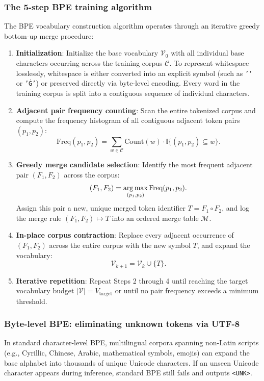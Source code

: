 \documentclass[../../../main.tex]{subfiles}
\begin{document}
\subsubsection{The 5-step BPE training algorithm}
The BPE vocabulary construction algorithm operates through an iterative greedy bottom-up merge procedure:
\begin{enumerate}
    \item \textbf{Initialization}: Initialize the base vocabulary $\mathcal{V}_0$ with all individual base characters occurring across the training corpus $\mathcal{C}$. To represent whitespace losslessly, whitespace is either converted into an explicit symbol (such as \texttt{'\textvisiblespace{}'} or \texttt{'Ġ'}) or preserved directly via byte-level encoding. Every word in the training corpus is split into a contiguous sequence of individual characters.
    \item \textbf{Adjacent pair frequency counting}: Scan the entire tokenized corpus and compute the frequency histogram of all contiguous adjacent token pairs $(p_1, p_2)$:
    \begin{equation}
    \label{eq:bpe_pair_counting}
    \text{Freq}(p_1, p_2) = \sum_{w \in \mathcal{C}} \text{Count}(w) \cdot \mathbb{I}\{(p_1, p_2) \subseteq w\}.
    \end{equation}
    \item \textbf{Greedy merge candidate selection}: Identify the most frequent adjacent pair $(F_1, F_2)$ across the corpus:
    \begin{equation}
    (F_1, F_2) = \operatorname*{\mathrm{arg\,max}}_{(p_1, p_2)} \text{Freq}(p_1, p_2).
    \end{equation}
    Assign this pair a new, unique merged token identifier $T = F_1 \circ F_2$, and log the merge rule $(F_1, F_2) \mapsto T$ into an ordered merge table $\mathcal{M}$.
    \item \textbf{In-place corpus contraction}: Replace every adjacent occurrence of $(F_1, F_2)$ across the entire corpus with the new symbol $T$, and expand the vocabulary:
    \begin{equation}
    \mathcal{V}_{k+1} = \mathcal{V}_k \cup \{T\}.
    \end{equation}
    \item \textbf{Iterative repetition}: Repeat Steps 2 through 4 until reaching the target vocabulary budget $|\mathcal{V}| = V_{\text{target}}$ or until no pair frequency exceeds a minimum threshold.
\end{enumerate}

\subsubsection{Byte-level BPE: eliminating unknown tokens via UTF-8}
In standard character-level BPE, multilingual corpora spanning non-Latin scripts (e.g., Cyrillic, Chinese, Arabic, mathematical symbols, emojis) can expand the base alphabet into thousands of unique Unicode characters. If an unseen Unicode character appears during inference, standard BPE still fails and outputs \texttt{<UNK>}.
\end{document}
